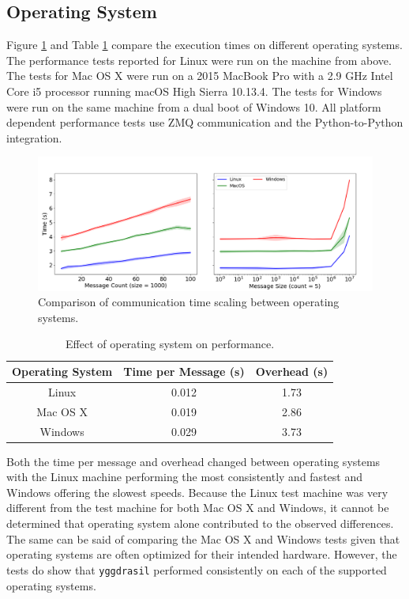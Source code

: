 \documentclass[journal]{IEEEtran}
\newcommand{\pkg}{{\tt yggdrasil}{}}
\begin{document}
\subsection{Operating System}\label{SS:results_platform}
%
Figure \ref{fig:platform} and Table \ref{tab:platform} compare the execution times on different operating systems. The performance tests reported for Linux were run on the machine from above. The tests for Mac OS X were run on a 2015 MacBook Pro with a 2.9 GHz Intel Core i5 processor running macOS High Sierra 10.13.4. The tests for Windows were run on the same machine from a dual boot of Windows 10. All platform dependent performance tests use ZMQ communication and the Python-to-Python integration.
%
\ifinclfig
 	\begin{figure}[htbp]
	\begin{center}
	\includegraphics[width=\columnwidth,keepaspectratio]{./images/scaling_platform.png}
	\caption{Comparison of communication time scaling between operating systems.}
	\label{fig:platform}
	\end{center}
	\end{figure}
\fi
%
\begin{table}[htbp]
\begin{center}
\begin{tabular}{|c|c|c|}
\hline
Operating System	& Time per Message (s) 	& Overhead (s) 	\\\hline
Linux			& 0.012				& 1.73			\\
Mac OS X			& 0.019				& 2.86			\\
Windows			& 0.029				& 3.73			\\\hline
\end{tabular}
\end{center}
\caption{Effect of operating system on performance.}
\label{tab:platform}
\end{table}%
%
Both the time per message and overhead changed between operating systems with the Linux machine performing the most consistently and fastest and Windows offering the slowest speeds. Because the Linux test machine was very different from the test machine for both Mac OS X and Windows, it cannot be determined that operating system alone contributed to the observed differences. The same can be said of comparing the Mac OS X and Windows tests given that operating systems are often optimized for their intended hardware. However, the tests do show that {\pkg} performed consistently on each of the supported operating systems.
\end{document}
